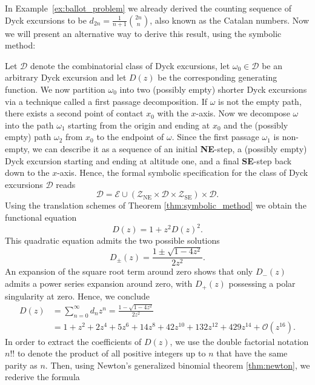 \begin{example} \label{ex:catalan_numbers}
  In Example~\ref{ex:ballot_problem} we already derived the counting sequence of Dyck excursions to be $d_{2n} = \frac{1}{n + 1}\binom{2n}{n}$, also known as the Catalan numbers. Now we will present an alternative way to derive this result, using the symbolic method:

  Let $\mathcal{D}$ denote the combinatorial class of Dyck excursions, let $\omega_0 \in \mathcal{D}$ be an arbitrary Dyck excursion and let $D(z)$ be the corresponding generating function. We now partition $\omega_0$ into two (possibly empty) shorter Dyck excursions via a technique called a first passage decomposition. If $\omega$ is not the empty path, there exists a second point of contact $x_0$ with the $x$-axis. Now we decompose $\omega$ into the path $\omega_1$ starting from the origin and ending at $x_0$ and the (possibly empty) path $\omega_2$ from $x_0$ to the endpoint of $\omega$. Since the first passage $\omega_1$ is non-empty, we can describe it as a sequence of an initial \textbf{NE}-step, a (possibly empty) Dyck excursion starting and ending at altitude one, and a final \textbf{SE}-step back down to the $x$-axis.
  Hence, the formal symbolic specification for the class of Dyck excursions $\mathcal{D}$ reads
  $$
  \mathcal{D} = \mathcal{E} \cup (\mathcal{Z}_{\mathrm{NE}} \times \mathcal{D} \times \mathcal{Z}_{\mathrm{SE}}) \times \mathcal{D}.
  $$
  Using the translation schemes of Theorem \ref{thm:symbolic_method} we obtain the functional equation
  $$
    D(z) = 1 + z^2D(z)^2.
  $$
  This quadratic equation admits the two possible solutions
  $$
    D_\pm(z) = \frac{1 \pm \sqrt{1 - 4z^2}}{2z^2}.
  $$
  An expansion of the square root term around zero shows that only $D_-(z)$ admits a power series expansion around zero, with $D_+(z)$ possessing a polar singularity at zero. Hence, we conclude
  \begin{align*}
    D(z) &= \sum_{n=0}^\infty d_n z^n = \frac{1 - \sqrt{1 - 4z^2}}{2z^2} \\
    &= 1 + z^2 + 2z^4 + 5z^6 + 14z^8 + 42z^{10} + 132z^{12} + 429z^{14} + \mathcal{O}(z^{16}).
  \end{align*}
  In order to extract the coefficients of $D(z)$, we use the double factorial notation $n!!$ to denote the product of all positive integers up to $n$ that have the same parity as $n$.
  Then, using Newton's generalized binomial theorem \ref{thm:newton}, we rederive the formula

\end{example}
